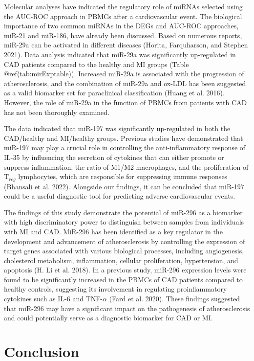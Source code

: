 \documentclass[smallextended]{svjour3}       %
\begin{document}
Molecular analyses have indicated the regulatory role of miRNAs selected
using the AUC-ROC approach in PBMCs after a cardiovascular event. The
biological importance of two common miRNAs in the DEGs and AUC-ROC
approaches, miR-21 and miR-186, have already been discussed. Based on
numerous reports, miR-29a can be activated in different diseases
(Horita, Farquharson, and Stephen 2021). Data analysis indicated that
miR-29a was significantly up-regulated in CAD patients compared to the
healthy and MI groups (Table @ref(tab:mirExptable)). Increased miR-29a
is associated with the progression of atherosclerosis, and the
combination of miR-29a and ox-LDL has been suggested as a valid
biomarker set for paraclinical classification (Huang et al. 2016).
However, the role of miR-29a in the function of PBMCs from patients with
CAD has not been thoroughly examined.

The data indicated that miR-197 was significantly up-regulated in both
the CAD/healthy and MI/healthy groups. Previous studies have
demonstrated that miR-197 may play a crucial role in controlling the
anti-inflammatory response of IL-35 by influencing the secretion of
cytokines that can either promote or suppress inflammation, the ratio of
M1/M2 macrophages, and the proliferation of T\(_{reg}\) lymphocytes,
which are responsible for suppressing immune responses (Bhansali et al.
2022). Alongside our findings, it can be concluded that miR-197 could be
a useful diagnostic tool for predicting adverse cardiovascular events.

The findings of this study demonstrate the potential of miR-296 as a
biomarker with high discriminatory power to distinguish between samples
from individuals with MI and CAD. MiR-296 has been identified as a key
regulator in the development and advancement of atherosclerosis by
controlling the expression of target genes associated with various
biological processes, including angiogenesis, cholesterol metabolism,
inflammation, cellular proliferation, hypertension, and apoptosis (H. Li
et al. 2018). In a previous study, miR-296 expression levels were found
to be significantly increased in the PBMCs of CAD patients compared to
healthy controls, suggesting its involvement in regulating
proinflammatory cytokines such as IL-6 and TNF-\(\alpha\) (Fard et al.
2020). These findings suggested that miR-296 may have a significant
impact on the pathogenesis of atherosclerosis and could potentially
serve as a diagnostic biomarker for CAD or MI.

\hypertarget{conclusion}{%
\section{Conclusion}\label{conclusion}}
\end{document}
